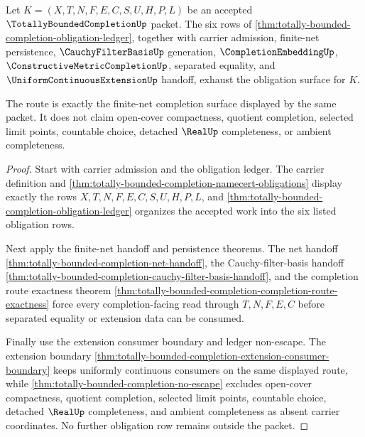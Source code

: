 \begin{theorem}
\label{thm:totally-bounded-completion-obligation-closure-route}
Let $K=(X,T,N,F,E,C,S,U,H,P,L)$ be an accepted $\TotallyBoundedCompletionUp$ packet. The six rows of \autoref{thm:totally-bounded-completion-obligation-ledger}, together with carrier admission, finite-net persistence, $\CauchyFilterBasisUp$ generation, $\CompletionEmbeddingUp$, $\ConstructiveMetricCompletionUp$, separated equality, and $\UniformContinuousExtensionUp$ handoff, exhaust the obligation surface for $K$.

The route is exactly the finite-net completion surface displayed by the same packet. It does not claim open-cover compactness, quotient completion, selected limit points, countable choice, detached $\RealUp$ completeness, or ambient completeness.
\end{theorem}
\begin{proof}
Start with carrier admission and the obligation ledger. The carrier definition and \autoref{thm:totally-bounded-completion-namecert-obligations} display exactly the rows $X,T,N,F,E,C,S,U,H,P,L$, and \autoref{thm:totally-bounded-completion-obligation-ledger} organizes the accepted work into the six listed obligation rows.

Next apply the finite-net handoff and persistence theorems. The net handoff \autoref{thm:totally-bounded-completion-net-handoff}, the Cauchy-filter-basis handoff \autoref{thm:totally-bounded-completion-cauchy-filter-basis-handoff}, and the completion route exactness theorem \autoref{thm:totally-bounded-completion-completion-route-exactness} force every completion-facing read through $T,N,F,E,C$ before separated equality or extension data can be consumed.

Finally use the extension consumer boundary and ledger non-escape. The extension boundary \autoref{thm:totally-bounded-completion-extension-consumer-boundary} keeps uniformly continuous consumers on the same displayed route, while \autoref{thm:totally-bounded-completion-no-escape} excludes open-cover compactness, quotient completion, selected limit points, countable choice, detached $\RealUp$ completeness, and ambient completeness as absent carrier coordinates. No further obligation row remains outside the packet.
\end{proof}

